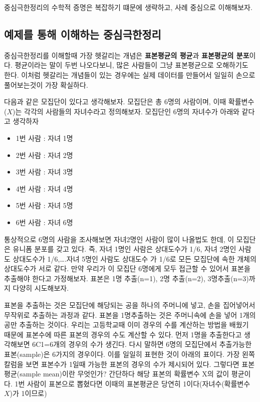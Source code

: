 \documentclass[
]{book}
\providecommand{\tightlist}{%
  \setlength{\itemsep}{0pt}\setlength{\parskip}{0pt}}
\begin{document}
중심극한정리의 수학적 증명은 복잡하기 떄문에 생략하고, 사례 중심으로 이해해보자.

\subsection{예제를 통해 이해하는 중심극한정리}\label{uxc608uxc81cuxb97c-uxd1b5uxd574-uxc774uxd574uxd558uxb294-uxc911uxc2ecuxadf9uxd55cuxc815uxb9ac}

중심극한정리를 이해할때 가장 헷갈리는 개념은 \textbf{표본평균의 평균}과 \textbf{표본평균의 분포}이다. 평균이라는 말이 두번 나오다보니, 많은 사람들이 그냥 표본평균으로 오해하기도 한다. 이처럼 헷갈리는 개념들이 있는 경우에는 실제 데이터를 만들어서 일일히 손으로 풀어보는것이 가장 확실하다.

다음과 같은 모집단이 있다고 생각해보자. 모집단은 총 6명의 사람이며, 이때 확률변수(\(X\))는 각각의 사람들의 자녀수라고 정의해보자. 모집단인 6명의 자녀수가 아래와 같다고 생각하자

\begin{itemize}
\tightlist
\item
  1번 사람 : 자녀 1명
\item
  2번 사람 : 자녀 2명
\item
  3번 사람 : 자녀 3명
\item
  4번 사람 : 자녀 4명
\item
  5번 사람 : 자녀 5명
\item
  6번 사람 : 자녀 6명
\end{itemize}

통상적으로 6명의 사람을 조사해보면 자녀2명인 사람이 많이 나올법도 한데, 이 모집단은 유니폼 분포를 갖고 있다. 즉, 자녀 1명인 사람은 상대도수가 1/6, 자녀 2명인 사람도 상대도수가 1/6,\ldots.자녀 5명인 사람도 상대도수 가 1/6로 모든 모집단에 속한 개체의 상대도수가 서로 같다.
만약 우리가 이 모집단 6명에게 모두 접근할 수 있어서 표본을 추출해야 한다고 가정해보자. 표본은 1명 추출(n=1), 2명 추출(n=2), 3명추출(n=3)까지 다양히 시도해보자.

표본을 추출하는 것은 모집단에 해당되는 공을 하나의 주머니에 넣고, 손을 집어넣어서 무작위로 추출하는 과정과 같다. 표본을 1명추출하는 것은 주머니속에 손을 넣어 1개의 공만 추출하는 것이다. 우리는 고등학교때 이미 경우의 수를 계산하는 방법을 배웠기 때문에 표본수에 따른 표본의 경우의 수도 계산할 수 있다.
먼저 1명을 추출한다고 생각해보면 6C1=6개의 경우의 수가 생긴다. 다시 말하면 6명의 모집단에서 추출가능한 표본(sample)은 6가지의 경우이다. 이를 일일히 표현한 것이 아래의 표이다. 가장 왼쪽 칼럼을 보면 표본수가 1일때 가능한 표본의 경우의 수가 제시되어 있다. 그렇다면 표본 평균(sample mean)이란 무엇인가? 간단하다 해당 표본의 확률변수 X의 값이 평균이다. 1번 사람이 표본으로 뽑혔다면 이때의 표본평균은 당연히 1이다(자녀수(확률변수 \(X\))가 1이므로)
\end{document}
